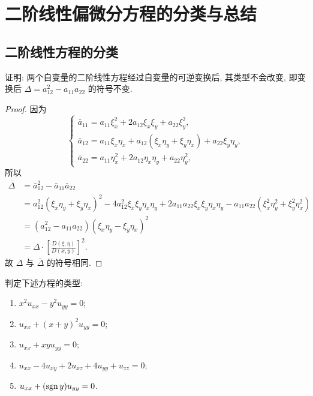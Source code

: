 \setcounter{chapter}{3}
\chapter{二阶线性偏微分方程的分类与总结}

\section{二阶线性方程的分类}


\begin{exercise}
  证明: 两个自变量的二阶线性方程经过自变量的可逆变换后, 其类型不会改变,
  即变换后 $\Delta = a_{12}^2 - a_{11}a_{22}$ 的符号不变.
\end{exercise}

\begin{proof}
  因为
  \[\begin{cases}
  \bar{a}_{11}=a_{11}\xi_x^2+2a_{12}\xi_x\xi_y+a_{22}\xi_y^2, \\
  \bar{a}_{12}=a_{11}\xi_x\eta_x+a_{12}(\xi_x\eta_y+\xi_y\eta_x)+a_{22}\xi_y\eta_y, \\
  \bar{a}_{22}=a_{11}\eta_x^2+2a_{12}\eta_x\eta_y+a_{22}\eta_y^2,
  \end{cases}\]
  所以
  \[\begin{split}
    \overline{\Delta}
    & = \bar{a}_{12}^2-\bar{a}_{11}\bar{a}_{22} \\
    & = a_{12}^2(\xi_x\eta_y+\xi_y\eta_x)^2-4a_{12}^2\xi_x\xi_y\eta_x\eta_y+2a_{11}a_{22}\xi_x\xi_y\eta_x\eta_y-a_{11}a_{22}(\xi_x^2\eta_y^2+\xi_y^2\eta_x^2) \\
    & = (a_{12}^2-a_{11}a_{22})(\xi_x\eta_y-\xi_y\eta_x)^2 \\
    & = \Delta\cdot\left[\frac{D(\xi,\eta)}{D(x,y)}\right]^2.
  \end{split}\]
  故 $\Delta$ 与 $\overline{\Delta}$ 的符号相同.
\end{proof}


\begin{exercise}
  判定下述方程的类型:
  \begin{enumerate}[(1)]
    \item $x^2u_{xx} - y^2u_{yy} = 0$;
    \item $u_{xx} + (x+y)^2 u_{yy} = 0$;
    \item $u_{xx} + xyu_{yy} = 0$;
    \item $u_{xx} - 4u_{xy} + 2u_{xz} + 4u_{yy} + u_{zz} = 0$;
    \item $u_{xx} + (\operatorname{sgn} y)u_{yy} = 0$.
  \end{enumerate}
\end{exercise}

